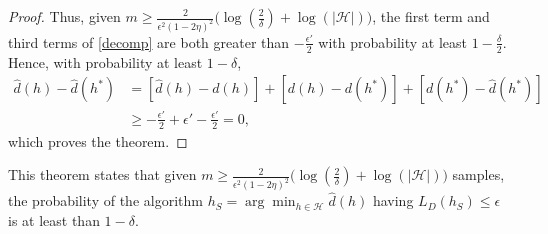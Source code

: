 \documentclass[]{article}
\newcommand{\cH}{\mathcal{H}}
\begin{document}
\begin{proof}
		\noindent
		Thus, given $m\geq \frac{2}{\epsilon^2(1-2\eta)^2}\Big(\log(\frac{2}{\delta})+\log(|\cH|)\Big)$, the first term and third terms of \eqref{decomp} are both greater than $-\frac{\epsilon'}{2}$ with probability at least $1-\frac{\delta}{2}$.  Hence, with probability at least $1-\delta$, 
		\begin{align}
		\hat{d}(h) - \hat{d}(h^*) &= [\hat{d}(h) - d(h)]+[d(h) - d(h^*)]+[d(h^*) - \hat{d}(h^*)]\\
		&\geq -\frac{\epsilon'}{2} + \epsilon' - \frac{\epsilon'}{2} = 0,
		\end{align}
		which proves the theorem.
	\end{proof}
	
	
	This theorem states that given $m\geq \frac{2}{\epsilon^2(1-2\eta)^2}\Big(\log(\frac{2}{\delta})+\log(|\cH|)\Big)$ samples, the probability of the algorithm $h_S = \arg\min_{h\in\cH} \hat{d}(h)$ having $L_D(h_S)\leq\epsilon$ is at least than $1-\delta$.
	
	
	
	
	
	
\end{document}
